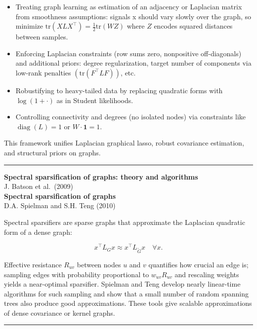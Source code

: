 \documentclass[a5paper]{article}
\providecommand{\tightlist}{%
  \setlength{\itemsep}{0pt}\setlength{\parskip}{0pt}}
\begin{document}
\begin{itemize}
\tightlist
\item
  Treating graph learning as estimation of an adjacency or Laplacian
  matrix from smoothness assumptions: signals x should vary slowly over
  the graph, so minimize $\mathrm{tr}(XLX^\top) =
  \tfrac12\mathrm{tr}(WZ)$ where $Z$ encodes squared distances between
  samples.
\item
  Enforcing Laplacian constraints (row sums zero, nonpositive
  off-diagonals) and additional priors: degree regularization, target
  number of components via low-rank penalties $(\mathrm{tr}(F^\top L
  F))$, etc.
\item
  Robustifying to heavy-tailed data by replacing quadratic forms with
  $\log(1+\cdot)$ as in Student likelihoods.
\item
  Controlling connectivity and degrees (no isolated nodes) via
  constraints like $\operatorname{diag}(L)=1$ or $W\cdot \mathbf{1}=1$.
\end{itemize}

This framework unifies Laplacian graphical lasso, robust covariance
estimation, and structural priors on graphs.

\begin{center}\rule{0.5\linewidth}{0.5pt}\end{center}

\textbf{Spectral sparsification of graphs: theory and algorithms}\\
J. Batson et al.~(2009)\\
\textbf{Spectral sparsification of graphs}\\
D.A. Spielman and S.H. Teng (2010)

Spectral sparsifiers are sparse graphs that approximate the Laplacian
quadratic form of a dense graph:

\[ x^\top L_G x \approx x^\top L_{\tilde G} x\quad\forall x.
\]

Effective resistance $R_{uv}$ between nodes $u$ and $v$ quantifies how
crucial an edge is; sampling edges with probability proportional to
$w_{uv}R_{uv}$ and rescaling weights yields a near-optimal
sparsifier. Spielman and Teng develop nearly linear-time algorithms for
such sampling and show that a small number of random spanning trees also
produce good approximations. These tools give scalable approximations of
dense covariance or kernel graphs.

\begin{center}\rule{0.5\linewidth}{0.5pt}\end{center}
\end{document}
